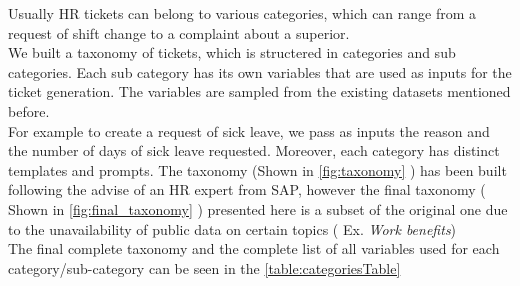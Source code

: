 Usually HR tickets can belong to various categories, which can range from a request of shift change to a complaint about a superior. \\
We built a taxonomy of tickets, which is structered in categories and sub categories. Each sub category has its own variables that are used as inputs for the ticket generation. The variables are sampled from the existing datasets mentioned before. \\
For example to create a request of sick leave, we pass as inputs the reason and the number of days of sick leave requested. Moreover, each category has distinct templates and prompts. The taxonomy (Shown in \autoref{fig:taxonomy} ) has been built following the advise of an HR expert from SAP, however the final taxonomy ( Shown in \autoref{fig:final_taxonomy} ) presented here is a subset of the original one due to the unavailability of public data on certain topics ( Ex. \textit{Work benefits}) \\ The final complete taxonomy and the complete list of all variables used for each category/sub-category can be seen in the \autoref{table:categoriesTable}


\begin{table}[h]
\caption{Table of all defined categories and sub-categories with their respective variables}\label{table:categoriesTable}
\end{table}
